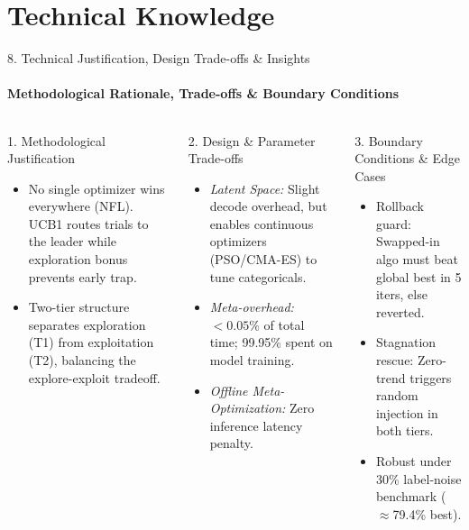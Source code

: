 \documentclass[aspectratio=169, 11pt]{beamer}
\begin{document}
\section{Technical Knowledge}

\begin{frame}{8. Technical Justification, Design Trade-offs \& Insights}
    \framesubtitle{Methodological Rationale, Trade-offs \& Boundary Conditions}
    \begin{columns}[T]
        \begin{block}{1. Methodological Justification}
            \scriptsize
            \begin{itemize}
                \setlength{\itemsep}{1pt}
                \item No single optimizer wins everywhere (NFL). UCB1 routes trials to the leader while exploration bonus prevents early trap.
                \item Two-tier structure separates exploration (T1) from exploitation (T2), balancing the explore-exploit tradeoff.
            \end{itemize}
        \end{block}

        \begin{block}{2. Design \& Parameter Trade-offs}
            \scriptsize
            \begin{itemize}
                \setlength{\itemsep}{1pt}
                \item \textit{Latent Space:} Slight decode overhead, but enables continuous optimizers (PSO/CMA-ES) to tune categoricals.
                \item \textit{Meta-overhead:} $<0.05\%$ of total time; 99.95\% spent on model training.
                \item \textit{Offline Meta-Optimization:} Zero inference latency penalty.
            \end{itemize}
        \end{block}

        \begin{block}{3. Boundary Conditions \& Edge Cases}
            \scriptsize
            \begin{itemize}
                \setlength{\itemsep}{1pt}
                \item Rollback guard: Swapped-in algo must beat global best in 5 iters, else reverted.
                \item Stagnation rescue: Zero-trend triggers random injection in both tiers.
                \item Robust under 30\% label-noise benchmark ($\approx$79.4\% best).
            \end{itemize}
        \end{block}


\end{columns}
\end{frame}
\end{document}
